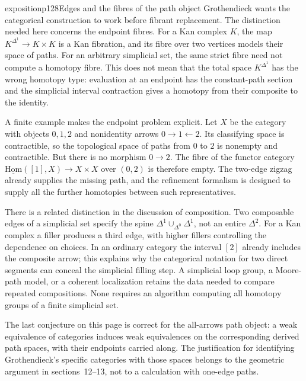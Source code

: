 \begin{dcomment}{exposition}{p128}{Edges and the fibres of the path object}
Grothendieck wants the categorical construction to work before fibrant replacement. The distinction needed here concerns the endpoint fibres. For a Kan complex $K$, the map $K^{\Delta^1}\to K\times K$ is a Kan fibration, and its fibre over two vertices models their space of paths. For an arbitrary simplicial set, the same strict fibre need not compute a homotopy fibre. This does not mean that the total space $K^{\Delta^1}$ has the wrong homotopy type: evaluation at an endpoint has the constant-path section and the simplicial interval contraction gives a homotopy from their composite to the identity.

A finite example makes the endpoint problem explicit. Let $X$ be the category with objects $0,1,2$ and nonidentity arrows $0\to1\leftarrow2$. Its classifying space is contractible, so the topological space of paths from $0$ to $2$ is nonempty and contractible. But there is no morphism $0\to2$. The fibre of the functor category $\underline{\mathrm{Hom}}([1],X)\to X\times X$ over $(0,2)$ is therefore empty. The two-edge zigzag already supplies the missing path, and the refinement formalism is designed to supply all the further homotopies between such representatives.

There is a related distinction in the discussion of composition. Two composable edges of a simplicial set specify the spine $\Delta^1\cup_{\Delta^0}\Delta^1$, not an entire $\Delta^2$. For a Kan complex a filler produces a third edge, with higher fillers controlling the dependence on choices. In an ordinary category the interval $[2]$ already includes the composite arrow; this explains why the categorical notation for two direct segments can conceal the simplicial filling step. A simplicial loop group, a Moore-path model, or a coherent localization retains the data needed to compare repeated compositions. None requires an algorithm computing all homotopy groups of a finite simplicial set.

The last conjecture on this page is correct for the all-arrows path object: a weak equivalence of categories induces weak equivalences on the corresponding derived path spaces, with their endpoints carried along. The justification for identifying Grothendieck's specific categories with those spaces belongs to the geometric argument in sections~12--13, not to a calculation with one-edge paths.
\end{dcomment}

